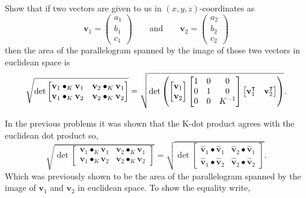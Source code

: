 \documentclass[newpage,hints,handout]{ximera}
\begin{document}
\begin{problem}
  
  Show that if two vectors are given to us in $(x,y,z)$-coordinates as
  \[
  \mathbf{v}_{1}=\begin{pmatrix}a_{1} \\ b_{1} \\ c_{1}\end{pmatrix}
  \qquad\text{and}\qquad
  \mathbf{v}_{2} =\begin{pmatrix}a_{2} \\ b_{2} \\ c_{2}\end{pmatrix}
  \]
  then the area of the parallelogram spanned by the image of those two vectors in
  euclidean space is%
  \[
  \sqrt{\det
    \begin{bmatrix}
      \mathbf{v}_{1}\bullet_{K}\mathbf{v}_{1} & \mathbf{v}_{2}\bullet_{K}\mathbf{v}_{1}\\
      \mathbf{v}_{1}\bullet_{K}\mathbf{v}_{2} & \mathbf{v}_{2}\bullet_{K}\mathbf{v}_{2}%
    \end{bmatrix}}
  =\sqrt{\det\left( 
      \begin{bmatrix}
        \mathbf{v}_{1} \\
        \mathbf{v}_{2}
      \end{bmatrix}
      \begin{bmatrix}
        1 & 0 & 0\\
        0 & 1 & 0\\
        0 & 0 & K^{-1}%
      \end{bmatrix}
      \begin{bmatrix}
        \mathbf{v}_{1}^\transpose & \mathbf{v}_{2}^\transpose%
      \end{bmatrix}
    \right) }.
\]


\begin{freeResponse} In the previous problems it was shown that the K-dot product agrees with the euclidean dot product so, 
\[
\sqrt{\det
\begin{bmatrix}
\mathbf{v}_{1}\bullet_{K}\mathbf{v}_{1} & \mathbf{v}_{2}\bullet_{K}\mathbf{v}_{1}\\
\mathbf{v}_{1}\bullet_{K}\mathbf{v}_{2} & \mathbf{v}_{2}\bullet_{K}\mathbf{v}_{2}%
\end{bmatrix}}
=
\sqrt{\det
\begin{bmatrix}
\hat{\mathbf v}_{1}\bullet \hat{\mathbf v}_{1} & \hat{\mathbf v}_{2}\bullet \hat{\mathbf v}_{1}\\
\hat{\mathbf v}_{1}\bullet \hat{\mathbf v}_{2} & \hat{\mathbf v}_{2}\bullet \hat{\mathbf v}_{2}%
\end{bmatrix}}.
\]
Which was previously shown to be the area of the parallelogram spanned by the image of $\mathbf{v}_1$ and $\mathbf{v}_2$ in euclidean space. To show the equality write,


\end{freeResponse}
\end{problem}
\end{document}
